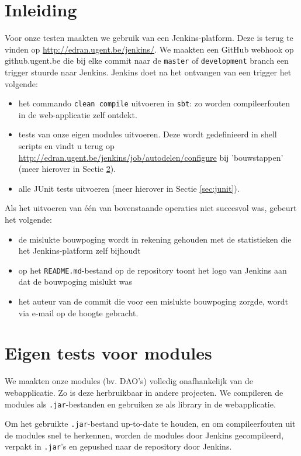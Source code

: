 \documentclass[11pt,a4paper,oneside]{article}
\begin{document}
\section{Inleiding}
Voor onze testen maakten we gebruik van een Jenkins-platform. Deze is terug te vinden op \url{http://edran.ugent.be/jenkins/}. We maakten een GitHub webhook op github.ugent.be die bij elke commit naar de \verb|master| of \verb|development| branch een trigger stuurde naar Jenkins.
Jenkins doet na het ontvangen van een trigger het volgende:
\begin{itemize}
\item het commando \verb|clean compile| uitvoeren in \verb|sbt|: zo worden compileerfouten in de web-applicatie zelf ontdekt.
\item tests van onze eigen modules uitvoeren. Deze wordt gedefinieerd in shell scripts en vindt u terug op \url{http://edran.ugent.be/jenkins/job/autodelen/configure} bij 'bouwstappen' (meer hierover in Sectie \ref{sec:modules}).
\item alle JUnit tests uitvoeren (meer hierover in Sectie \ref{sec:junit}).
\end{itemize}
Als het uitvoeren van \'e\'en van bovenstaande operaties niet succesvol was, gebeurt het volgende:
\begin{itemize}
\item de mislukte bouwpoging wordt in rekening gehouden met de statistieken die het Jenkins-platform zelf bijhoudt
\item op het \verb|README.md|-bestand op de repository toont het logo van Jenkins aan dat de bouwpoging mislukt was
\item het auteur van de commit die voor een mislukte bouwpoging zorgde, wordt via e-mail op de hoogte gebracht.
\end{itemize} 


\section{Eigen tests voor modules}\label{sec:modules}
We maakten onze modules (bv. DAO's) volledig onafhankelijk van de webapplicatie. Zo is deze herbruikbaar in andere projecten. We compileren de modules als \verb|.jar|-bestanden en gebruiken ze als library in de webapplicatie.\par
Om het gebruikte \verb|.jar|-bestand up-to-date te houden, en om compileerfouten uit de modules snel te herkennen, worden de modules door Jenkins gecompileerd, verpakt in \verb|.jar|'s en gepushed naar de repository door Jenkins.
\end{document}
